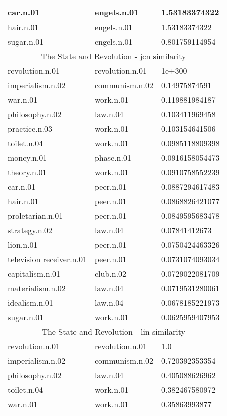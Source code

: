 \begin{center}
\begin{tabular}{ | l | l | l |}
car.n.01 & engels.n.01 & 1.53183374322 \\ \hline
hair.n.01 & engels.n.01 & 1.53183374322 \\ \hline
sugar.n.01 & engels.n.01 & 0.801759114954 \\ \hline
\multicolumn{3}{|c|}{The State and Revolution - jcn similarity} \\ \hline
revolution.n.01 & revolution.n.01 & 1e+300 \\ \hline
imperialism.n.02 & communism.n.02 & 0.14975874591 \\ \hline
war.n.01 & work.n.01 & 0.119881984187 \\ \hline
philosophy.n.02 & law.n.04 & 0.103411969458 \\ \hline
practice.n.03 & work.n.01 & 0.103154641506 \\ \hline
toilet.n.04 & work.n.01 & 0.0985118809398 \\ \hline
money.n.01 & phase.n.01 & 0.0916158054473 \\ \hline
theory.n.01 & work.n.01 & 0.0910758552239 \\ \hline
car.n.01 & peer.n.01 & 0.0887294617483 \\ \hline
hair.n.01 & peer.n.01 & 0.0868826421077 \\ \hline
proletarian.n.01 & peer.n.01 & 0.0849595683478 \\ \hline
strategy.n.02 & law.n.04 & 0.07841412673 \\ \hline
lion.n.01 & peer.n.01 & 0.0750424463326 \\ \hline
television receiver.n.01 & peer.n.01 & 0.0731074093034 \\ \hline
capitalism.n.01 & club.n.02 & 0.0729022081709 \\ \hline
materialism.n.02 & law.n.04 & 0.0719531280061 \\ \hline
idealism.n.01 & law.n.04 & 0.0678185221973 \\ \hline
sugar.n.01 & work.n.01 & 0.0625959407953 \\ \hline
\multicolumn{3}{|c|}{The State and Revolution - lin similarity} \\ \hline
revolution.n.01 & revolution.n.01 & 1.0 \\ \hline
imperialism.n.02 & communism.n.02 & 0.720392353354 \\ \hline
philosophy.n.02 & law.n.04 & 0.405088626962 \\ \hline
toilet.n.04 & work.n.01 & 0.382467580972 \\ \hline
war.n.01 & work.n.01 & 0.35863993877 \\ \hline

\end{tabular}
\end{center}
